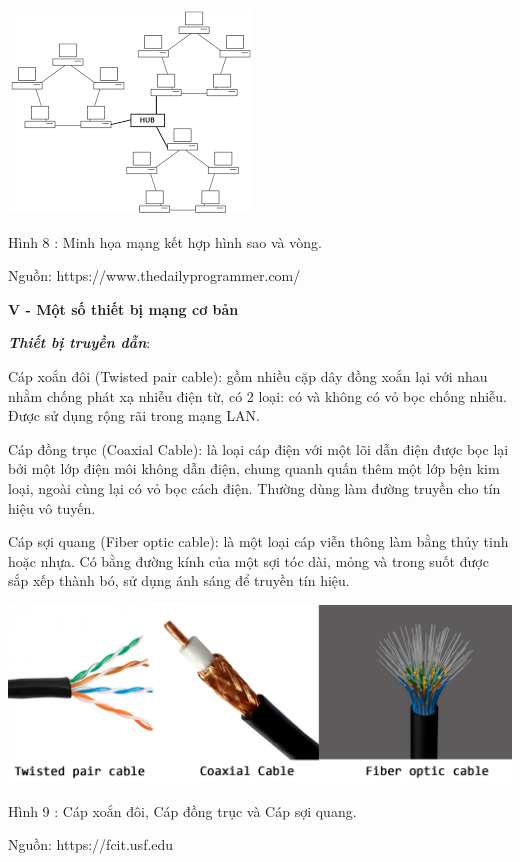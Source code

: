 \documentclass{report}
\begin{document}
\begin{center}
     \includegraphics[scale=0.8]{starring}
\end{center}
\centerline{Hình 8 : Minh họa mạng kết hợp hình sao và vòng.}
\changefontsizes{12pt}
\centerline{Nguồn: https://www.thedailyprogrammer.com/}

\bigskip
\changefontsizes{14pt}
\setlength{\parindent}{0.2cm}
\textbf{V - Một số thiết bị mạng cơ bản}

\changefontsizes{13pt}
\bigskip
\setlength{\parindent}{0.2cm}
\textbf{\textit{Thiết bị truyền dẫn}}:

\smallskip
Cáp xoắn đôi (Twisted pair cable): gồm nhiều cặp dây đồng xoắn lại với nhau nhằm chống phát xạ nhiễu điện từ, có 2 loại: có và không có vỏ bọc chống nhiễu. Được sử dụng rộng rãi trong mạng LAN.

\smallskip
Cáp đồng trục (Coaxial Cable): là loại cáp điện với một lõi dẫn điện được bọc lại bởi một lớp điện môi không dẫn điện, chung quanh quấn thêm một lớp bện kim loại, ngoài cùng lại có vỏ bọc cách điện. Thường dùng làm đường truyền cho tín hiệu vô tuyến.

\smallskip
Cáp sợi quang (Fiber optic cable): là một loại cáp viễn thông làm bằng thủy tinh hoặc nhựa. Có bằng đường kính của một sợi tóc dài, mỏng và trong suốt được sắp xếp thành bó, sử dụng ánh sáng để truyền tín hiệu.


\begin{center}
     \includegraphics[scale=0.23]{cap}
\end{center}
\centerline{Hình 9 : Cáp xoắn đôi, Cáp đồng trục và Cáp sợi quang.}
\changefontsizes{12pt}
\centerline{Nguồn: https://fcit.usf.edu}
\changefontsizes{13pt}
\end{document}
